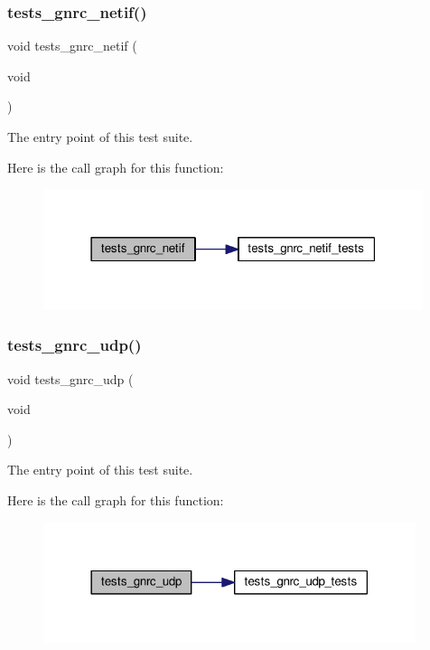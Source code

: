 \subsubsection{\texorpdfstring{tests\+\_\+gnrc\+\_\+netif()}{tests\_gnrc\_netif()}}
{\footnotesize\ttfamily void tests\+\_\+gnrc\+\_\+netif (\begin{DoxyParamCaption}\item[{void}]{ }\end{DoxyParamCaption})}



The entry point of this test suite. 

Here is the call graph for this function\+:
\nopagebreak
\begin{figure}[H]
\begin{center}
\leavevmode
\includegraphics[width=315pt]{group__unittests_gaa2175e6139cd4093cd5668926a58e869_cgraph}
\end{center}
\end{figure}
\mbox{\label{group__unittests_ga38d5edd024a05f621dcf3a505249ab59}} 
\subsubsection{\texorpdfstring{tests\+\_\+gnrc\+\_\+udp()}{tests\_gnrc\_udp()}}
{\footnotesize\ttfamily void tests\+\_\+gnrc\+\_\+udp (\begin{DoxyParamCaption}\item[{void}]{ }\end{DoxyParamCaption})}



The entry point of this test suite. 

Here is the call graph for this function\+:
\nopagebreak
\begin{figure}[H]
\begin{center}
\leavevmode
\includegraphics[width=309pt]{group__unittests_ga38d5edd024a05f621dcf3a505249ab59_cgraph}
\end{center}
\end{figure}
\mbox{\label{group__unittests_gac9c042435ff4e2597166100b86226d2a}} 
